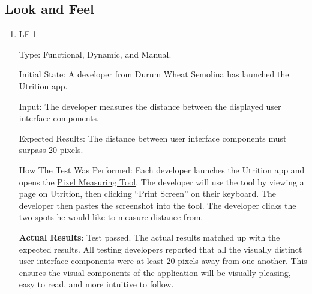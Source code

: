 \documentclass[12pt, titlepage]{article}
\begin{document}
	\subsection{Look and Feel}
	
	\begin{enumerate}
		\item{LF-1} 
		
		Type: Functional, Dynamic, and Manual.
		
		Initial State: A developer from Durum Wheat Semolina has launched the Utrition app.
		
		Input: The developer measures the distance between the displayed user interface components.
		
		Expected Results: The distance between user interface components must surpass 20 pixels.
		
		How The Test Was Performed: Each developer launches the Utrition app and opens the \href{https://www.rapidtables.com/web/tools/pixel-ruler.html}{Pixel Measuring Tool}. The developer will use the tool by viewing a page on Utrition, then clicking “Print Screen'' on their keyboard. The developer then pastes the screenshot into the tool. The developer clicks the two spots he would like to measure distance from.
		
		\textbf{Actual Results}: Test passed. The actual results matched up with the expected results. All testing developers reported that all the visually distinct user interface components were at least 20 pixels away from one another. This ensures the visual components of the application will be visually pleasing, easy to read, and more intuitive to follow.
		
	\end{enumerate}
	
\end{document}
